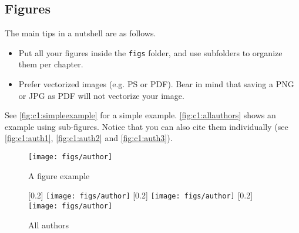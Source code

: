\subsection{Figures}
\label{sec:c1:latex_figures}

The main tips in a nutshell are as follows.
\begin{itemize}
    \item Put all your figures inside the \texttt{figs} folder,
          and use subfolders to organize them per chapter.
    \item Prefer vectorized images (e.g. PS or PDF).
          Bear in mind that saving a PNG or JPG as PDF
          will not vectorize your image.
\end{itemize}

See \autoref{fig:c1:simpleexample} for a simple example.
\autoref{fig:c1:allauthors} shows an example using sub-figures.
Notice that you can also cite them individually
(see \autoref{fig:c1:auth1}, \autoref{fig:c1:auth2} and \autoref{fig:c1:auth3}).

\begin{figure}
    \centering
    \texttt{[image: figs/author]}
    \caption{A figure example}
    \label{fig:c1:simpleexample}
\end{figure}

\begin{figure}
\centering
{}[0.2\textwidth]{%
    \texttt{[image: figs/author]}}%
\hspace{0.1\textwidth} %
[0.2\textwidth]{%
    \texttt{[image: figs/author]}}%
\hspace{0.1\textwidth} %
[0.2\textwidth]{%
    \texttt{[image: figs/author]}}%
\caption{All authors}
\label{fig:c1:allauthors}
\end{figure}
